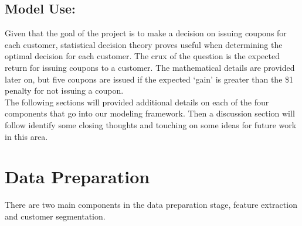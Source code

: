 \documentclass[12pt]{article} %
\begin{document}
\subsection*{Model Use:} 
Given that the goal of the project is to make a decision on issuing coupons for each customer, statistical decision theory proves useful when determining the optimal decision for each customer.  The crux of the question is the expected return for issuing coupons to a customer.  The mathematical details are provided later on, but five coupons are issued if the expected `gain' is greater than the \$1 penalty for not issuing a coupon.\\

The following sections will provided additional details on each of the four components that go into our modeling framework.  Then a discussion section will follow identify some closing thoughts and touching on some ideas for future work in this area. 
\section{Data Preparation}
There are two main components in the data preparation stage, feature extraction and customer segmentation.
\end{document}
